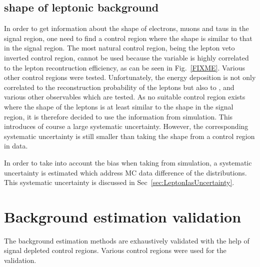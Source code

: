 \subsection*{\ias shape of leptonic background}
In order to get information about the \ias shape of electrons, muons and taus in the signal region, one need to find a control region where the shape is similar to that in the signal region.
The most natural control region, being the lepton veto inverted control region, cannot be used because the variable \ias is highly correlated to the lepton recontruction efficiency, as can be seen in Fig.~\ref{FIXME}.
Various other control regions were tested.
Unfortunately, the energy deposition is not only correlated to the reconstruction probability of the leptons but also to \ecalo, \pt and various other observables which are tested.
As no suitable control region exists where the \ias shape of the leptons is at least similar to the shape in the signal region, it is therefore decided to use the \ias information from simulation.
This introduces of course a large systematic uncertainty.
However, the corresponding systematic uncertainty is still smaller than taking the \ias shape from a control region in data.

In order to take into account the bias when taking \ias from simulation, a systematic uncertainty is estimated which address MC data difference of the \ias distributions.
This systematic uncertainty is discussed in Sec~\ref{sec:LeptonIasUncertainty}.
\section{Background estimation validation}
\label{sec:BkgValidation}

The background estimation methods are exhaustively validated with the help of signal depleted control regions.
Various control regions were used for the validation.

